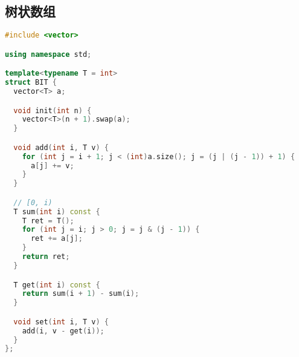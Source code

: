 \subsection{树状数组}
\begin{lstlisting}[language=C++]
#include <vector>

using namespace std;

template<typename T = int>
struct BIT {
  vector<T> a;

  void init(int n) {
    vector<T>(n + 1).swap(a);
  }

  void add(int i, T v) {
    for (int j = i + 1; j < (int)a.size(); j = (j | (j - 1)) + 1) {
      a[j] += v;
    }
  }

  // [0, i)
  T sum(int i) const {
    T ret = T();
    for (int j = i; j > 0; j = j & (j - 1)) {
      ret += a[j];
    }
    return ret;
  }

  T get(int i) const {
    return sum(i + 1) - sum(i);
  }

  void set(int i, T v) {
    add(i, v - get(i));
  }
};


\end{lstlisting}
